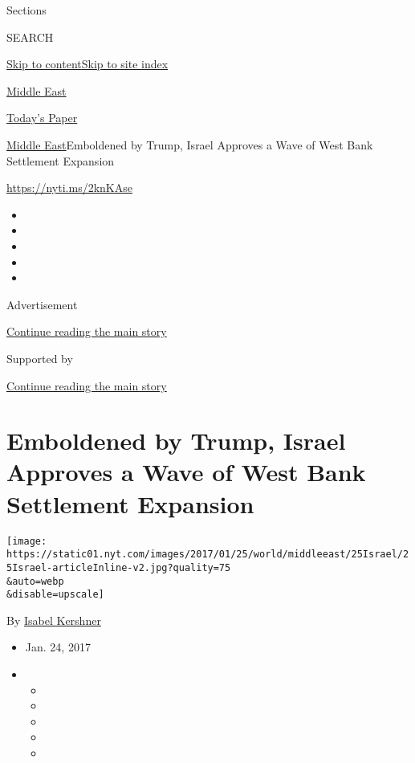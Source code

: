 Sections

SEARCH

\protect\hyperlink{site-content}{Skip to
content}\protect\hyperlink{site-index}{Skip to site index}

\href{https://www.nytimes.com/section/world/middleeast}{Middle East}

\href{https://myaccount.nytimes.com/auth/login?response_type=cookie\&client_id=vi}{}

\href{https://www.nytimes.com/section/todayspaper}{Today's Paper}

\href{/section/world/middleeast}{Middle East}\textbar{}Emboldened by
Trump, Israel Approves a Wave of West Bank Settlement Expansion

\url{https://nyti.ms/2knKAse}

\begin{itemize}
\item
\item
\item
\item
\item
\end{itemize}

Advertisement

\protect\hyperlink{after-top}{Continue reading the main story}

Supported by

\protect\hyperlink{after-sponsor}{Continue reading the main story}

\hypertarget{emboldened-by-trump-israel-approves-a-wave-of-west-bank-settlement-expansion}{%
\section{Emboldened by Trump, Israel Approves a Wave of West Bank
Settlement
Expansion}\label{emboldened-by-trump-israel-approves-a-wave-of-west-bank-settlement-expansion}}

\texttt{[image: https://static01.nyt.com/images/2017/01/25/world/middleeast/25Israel/25Israel-articleInline-v2.jpg?quality=75\\\&auto=webp\\\&disable=upscale]}

By \href{https://www.nytimes.com/by/isabel-kershner}{Isabel Kershner}

\begin{itemize}
\item
  Jan. 24, 2017
\item
  \begin{itemize}
  \item
  \item
  \item
  \item
  \item
  \end{itemize}
\end{itemize}

